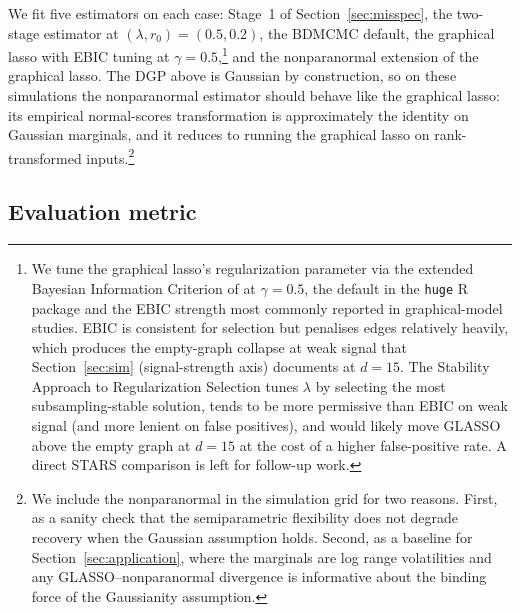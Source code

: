 We fit five estimators on each case: Stage~1 of Section~\ref{sec:misspec}, the two-stage estimator at $(\lambda, r_0) = (0.5, 0.2)$, the BDMCMC default, the graphical lasso with EBIC tuning at $\gamma = 0.5$,\footnote{We tune the graphical lasso's regularization parameter via the extended Bayesian Information Criterion of \textcite{foygelEBIC2010} at $\gamma = 0.5$, the default in the \texttt{huge} R package and the EBIC strength most commonly reported in graphical-model studies. EBIC is consistent for selection but penalises edges relatively heavily, which produces the empty-graph collapse at weak signal that Section~\ref{sec:sim} (signal-strength axis) documents at $d = 15$. The Stability Approach to Regularization Selection \parencite{liu2010stability} tunes $\lambda$ by selecting the most subsampling-stable solution, tends to be more permissive than EBIC on weak signal (and more lenient on false positives), and would likely move GLASSO above the empty graph at $d = 15$ at the cost of a higher false-positive rate. A direct STARS comparison is left for follow-up work.} and the nonparanormal extension of the graphical lasso. The DGP above is Gaussian by construction, so on these simulations the nonparanormal estimator should behave like the graphical lasso: its empirical normal-scores transformation is approximately the identity on Gaussian marginals, and it reduces to running the graphical lasso on rank-transformed inputs.\footnote{We include the nonparanormal in the simulation grid for two reasons. First, as a sanity check that the semiparametric flexibility does not degrade recovery when the Gaussian assumption holds. Second, as a baseline for Section~\ref{sec:application}, where the marginals are log range volatilities and any GLASSO--nonparanormal divergence is informative about the binding force of the Gaussianity assumption.} 

\subsection{Evaluation metric}

